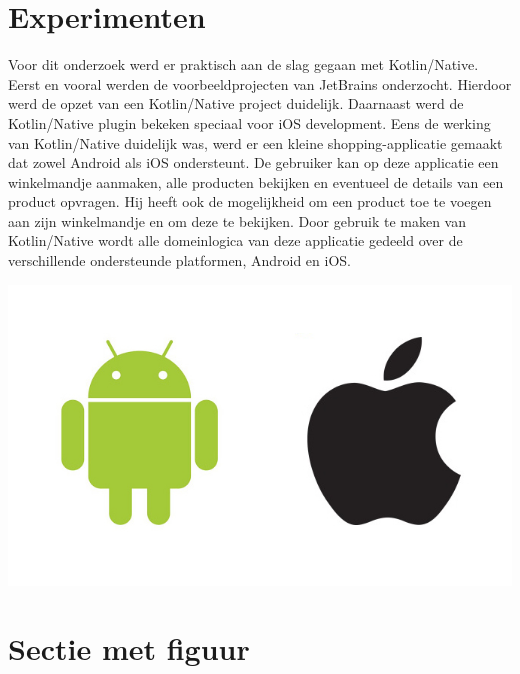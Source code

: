 \documentclass[a0,portrait]{a0poster}
\begin{document}
\begin{multicols}{2}
\color{Black} %
\color{HoGentAccent1} 
\section*{Experimenten}
\color{black}
Voor dit onderzoek werd er praktisch aan de slag gegaan met Kotlin/Native. Eerst en vooral werden de voorbeeldprojecten van JetBrains onderzocht. Hierdoor werd de opzet van een Kotlin/Native project duidelijk. Daarnaast werd de Kotlin/Native plugin bekeken speciaal voor iOS development. Eens de werking van Kotlin/Native duidelijk was, werd er een kleine shopping-applicatie gemaakt dat zowel Android als iOS ondersteunt. De gebruiker kan op deze applicatie een winkelmandje aanmaken, alle producten bekijken en eventueel de details van een product opvragen. Hij heeft ook de mogelijkheid om een product toe te voegen aan zijn winkelmandje en om deze te bekijken. Door gebruik te maken van Kotlin/Native wordt alle domeinlogica van deze applicatie gedeeld over de verschillende ondersteunde platformen, Android en iOS.

\begin{center}\vspace{1cm}
	\includegraphics[width=1.0\linewidth]{figures/apple-android.jpeg}
\end{center}\vspace{1cm}

\iffalse
\color{HoGentAccent1} 
\section*{Sectie met figuur}
\color{black}



\end{multicols}
\end{document}
